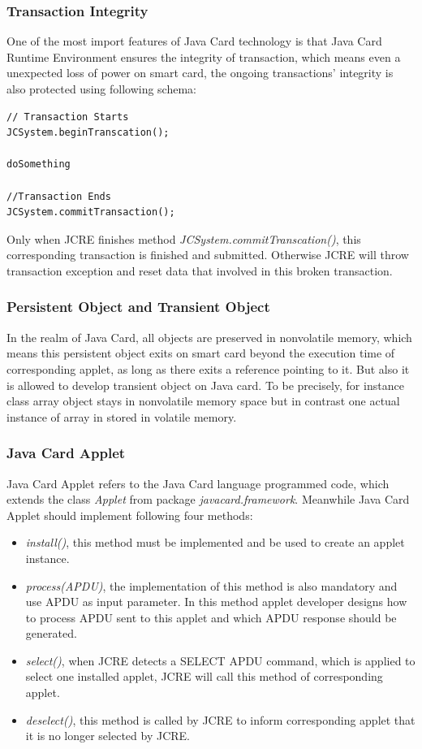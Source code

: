 \documentclass[]{llncs}
\begin{document}
\subsubsection{Transaction Integrity}
One of the most import features of Java Card technology is that Java Card Runtime Environment ensures the integrity of transaction, which means even a unexpected loss of power on smart card, the ongoing transactions' integrity is also  protected using  following schema\cite{handbuch}:
\begin{verbatim}
// Transaction Starts
JCSystem.beginTranscation();

doSomething

//Transaction Ends
JCSystem.commitTransaction();
\end{verbatim}
Only when JCRE finishes method \emph{JCSystem.commitTranscation()}, this corresponding transaction is finished and submitted. Otherwise JCRE will throw transaction exception and reset data that involved in this broken transaction.

\subsubsection{Persistent Object and Transient Object}
In  the realm of Java Card, all objects are preserved in nonvolatile memory, which means this persistent object exits on smart card beyond the execution time of corresponding applet, as long as there exits a reference pointing to it. But also it is allowed to develop transient object on Java card. To be precisely, for instance class array object stays in nonvolatile memory space but in contrast one actual instance of array in stored in volatile memory\cite{handbuch}.
\subsubsection{Java Card Applet}
Java Card Applet refers to the Java Card language programmed code, which extends the class \emph{Applet} from package \emph{javacard.framework}. Meanwhile Java Card Applet should implement following four methods:
\begin{itemize}
\item\emph{install()}, this method must be implemented and be used to create an applet instance.
\item\emph{process(APDU)}, the implementation of this method is also mandatory and use APDU as input parameter. In this method applet developer designs how to process APDU sent to this applet and which APDU response should be generated.
\item \emph{select()}, when JCRE detects a SELECT APDU command, which is applied to select one installed applet, JCRE will call this method of corresponding applet.
\item  \emph{deselect()}, this method is called by JCRE to inform corresponding applet that it is no longer selected by JCRE.
\end{itemize}
\end{document}
